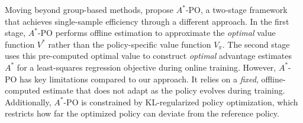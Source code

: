 Moving beyond group-based methods, \citet{brantley2025accelerating} propose $A^*$-PO, a two-stage framework that achieves single-sample efficiency through a different approach. In the first stage, $A^*$-PO performs offline estimation to approximate the \textit{optimal} value function $V^*$ rather than the policy-specific value function $V_\pi$. The second stage uses this pre-computed optimal value to construct \emph{optimal} advantage estimates $A^*$ for a least-squares regression objective during online training. However, $A^*$-PO has key limitations compared to our approach. It relies on a \emph{fixed}, offline-computed estimate that does not adapt as the policy evolves during training. Additionally, $A^*$-PO is constrained by KL-regularized policy optimization, which restricts how far the optimized policy can deviate from the reference policy.

